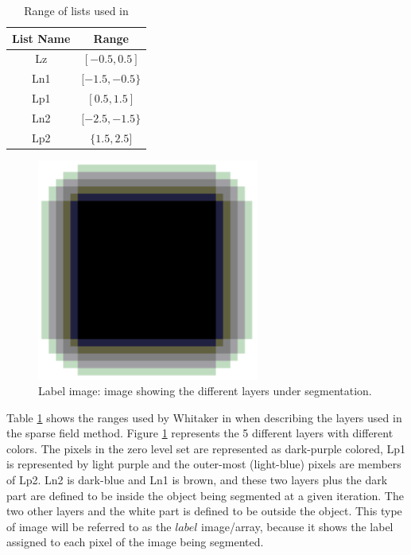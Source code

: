 \begin{table}[h] %
	\centering
	\begin{tabular}{| c | c |} 
	\hline
	List Name & Range\\ 
	\hline
	Lz & $[-0.5, 0.5]$\\
	Ln1 & $[-1.5, -0.5\}$\\
	Lp1 & $[0.5, 1.5]$\\
	Ln2 & $[-2.5, -1.5\}$\\
	Lp2 & $\{1.5, 2.5]$\\
	\hline
	\end{tabular}
	\caption{Range of lists used in \cite{lankton09}}
	\label{rangeTab1}
\end{table}

\begin{figure}[h!]
\centering
\includegraphics[width=0.65\textwidth]{implemented/labelExample}
\caption{Label image: image showing the different layers under segmentation.}
\label{labelExample}
\end{figure}
Table \ref{rangeTab1} shows the ranges used by Whitaker in \cite{whitaker89} when describing the layers used in the sparse field method. Figure \ref{labelExample} represents the 5 different layers with different colors. The pixels in the zero level set are represented as dark-purple colored, Lp1 is represented by light purple and the outer-most (light-blue) pixels are members of Lp2. Ln2 is dark-blue and Ln1 is brown, and these two layers plus the dark part are defined to be inside the object being segmented at a given iteration. The two other layers and the white part is defined to be outside the object. This type of image will be referred to as the $label$ image/array, because it shows the label assigned to each pixel of the image being segmented.

